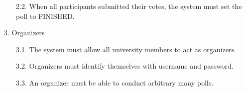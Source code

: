 \begin{enumerate}
\begin{enumerate}
	
	\item
	[2.2.] When all participants submitted their votes, the system must set the poll to FINISHED.
	
	
	\end{enumerate}




\item[3.] Organizers

	\begin{enumerate}
	\item
	[3.1.] The system must allow all university members to act as organizers. %
	
	
	\item
	[3.2.] Organizers must identify themselves with username and password. %
	
%		
%		
%		
%		
%	
	
	
	
	
	\item
	[3.3.] An organizer must be able to conduct arbitrary many polls. %
	
	
	
	
%	
%			
%			
%		
	
	
	\end{enumerate}





\end{enumerate}
